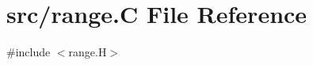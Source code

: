 \hypertarget{range_8_c}{}\section{src/range.C File Reference}
\label{range_8_c}
{\ttfamily \#include $<$range.\+H$>$}\newline
